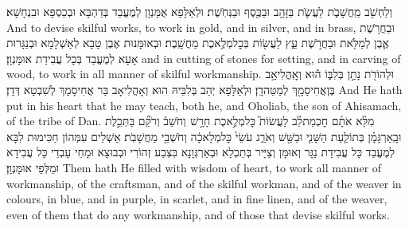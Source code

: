 {וְלַחְשֹׁ֖ב מַֽחֲשָׁבֹ֑ת לַעֲשֹׂ֛ת בַּזָּהָ֥ב וּבַכֶּ֖סֶף וּבַנְּחֹֽשֶׁת׃}
{וּלְאַלָּפָא אֻמָּנְוָן לְמֶעֱבַד בְּדַהְבָּא וּבְכַסְפָּא וּבִנְחָשָׁא׃}
{And to devise skilful works, to work in gold, and in silver, and in brass,}{}
{וּבַחֲרֹ֥שֶׁת אֶ֛בֶן לְמַלֹּ֖את וּבַחֲרֹ֣שֶׁת עֵ֑ץ לַעֲשׂ֖וֹת בְּכׇל\maqqaf מְלֶ֥אכֶת מַחֲשָֽׁבֶת׃}
{וּבְאוּמָּנוּת אֶבֶן טָבָא לְאַשְׁלָמָא וּבְנַגָּרוּת אָעָא לְמֶעֱבַד בְּכָל עֲבִידַת אוּמָּנְוָן׃}
{and in cutting of stones for setting, and in carving of wood, to work in all manner of skilful workmanship.}{}
{וּלְהוֹרֹ֖ת נָתַ֣ן בְּלִבּ֑וֹ ה֕וּא וְאׇֽהֳלִיאָ֥ב בֶּן\maqqaf אֲחִיסָמָ֖ךְ לְמַטֵּה\maqqaf דָֽן׃}
{וּלְאַלָּפָא יְהַב בְּלִבֵּיהּ הוּא וְאָהֳלִיאָב בַּר אֲחִיסָמָךְ לְשִׁבְטָא דְּדָן׃}
{And He hath put in his heart that he may teach, both he, and Oholiab, the son of Ahisamach, of the tribe of Dan.}{}
{מִלֵּ֨א אֹתָ֜ם חׇכְמַת\maqqaf לֵ֗ב לַעֲשׂוֹת֮ כׇּל\maqqaf מְלֶ֣אכֶת חָרָ֣שׁ \pasek  וְחֹשֵׁב֒ וְרֹקֵ֞ם בַּתְּכֵ֣לֶת וּבָֽאַרְגָּמָ֗ן בְּתוֹלַ֧עַת הַשָּׁנִ֛י וּבַשֵּׁ֖שׁ וְאֹרֵ֑ג עֹשֵׂי֙ כׇּל\maqqaf מְלָאכָ֔ה וְחֹשְׁבֵ֖י מַחֲשָׁבֹֽת׃}
{אַשְׁלֵים עִמְּהוֹן חַכִּימוּת לִבָּא לְמֶעֱבַד כָּל עֲבִידַת נַגָּר וְאוּמָּן וְצַיָּיר בְּתַכְלָא וּבְאַרְגְּוָנָא בִּצְבַע זְהוֹרִי וּבְבוּצָא וּמָחֵי עָבְדֵי כָּל עֲבִידָא וּמַלְּפֵי אוּמָּנְוָן׃}
{Them hath He filled with wisdom of heart, to work all manner of workmanship, of the craftsman, and of the skilful workman, and of the weaver in colours, in blue, and in purple, in scarlet, and in fine linen, and of the weaver, even of them that do any workmanship, and of those that devise skilful works.}{}

